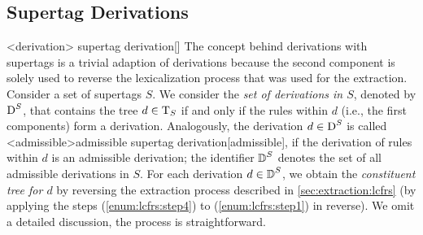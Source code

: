 \documentclass[../../document.tex]{subfiles}
\begin{document}
    \subsection*{ Supertag Derivations}
    <derivation>{ supertag derivation}[]
    The concept behind derivations with  supertags is a trivial adaption of  derivations because the second component is solely used to reverse the lexicalization process that was used for the extraction.
    Consider a set of  supertags \(S\).
    We consider the \emph{set of derivations in \(S\)}, denoted by \(\operatorname{D}^S\), that contains the tree \(d \in \operatorname{T}_S\) if and only if the  rules within \(d\) (i.e., the first components) form a derivation.
    Analogously, the derivation \(d\in \operatorname{D}^S\) is called <admissible>{admissible  supertag derivation}[admissible], if the derivation of  rules within \(d\) is an admissible derivation; the identifier \(\operatorname{\mathbb{D}}^S\) denotes the set of all admissible derivations in \(S\).
    For each derivation \(d \in \operatorname{\mathbb{D}}^S\), we obtain the \emph{constituent tree for \(d\)} by reversing the extraction process described in \cref{sec:extraction:lcfrs} (by applying the steps (\ref{enum:lcfrs:step4}) to (\ref{enum:lcfrs:step1}) in reverse).
    We omit a detailed discussion, the process is straightforward.
\end{document}
